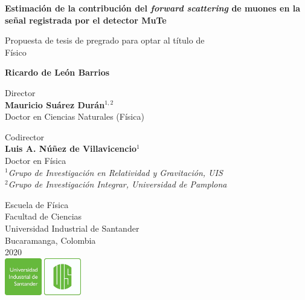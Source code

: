 \documentclass[12pt]{report}
\begin{document}
\begin{titlepage}
   \begin{center}
       \vspace*{1cm}
       
       
       \large
       \textbf{Estimación de la contribución del \textit{forward scattering} de muones en la señal registrada por el detector MuTe}
       
 
       \vspace{1.5cm}
 
       \small
       Propuesta de tesis de pregrado para optar al título de \\
       Físico
       
       
       \normalsize
       \textbf{Ricardo de León Barrios}
       
       \small
       \vspace{1cm}
       Director\\
       \textbf{Mauricio Suárez Durán}$^{1,2}$\\
       Doctor en Ciencias Naturales (Física)
       
       \vspace{1cm}
       Codirector\\
       \textbf{Luis A. Núñez de Villavicencio}$^1$\\
       Doctor en Física\\
       
       \vspace{1cm}
       $^1$\textit{Grupo de Investigación en Relatividad y Gravitación, UIS}\\
       $^2$\textit{Grupo de Investigación Integrar, Universidad de Pamplona}
 
       \vfill
       
       
 
 
       
 
       \small
       Escuela de Física\\
       Facultad de Ciencias\\
       Universidad Industrial de Santander\\
       Bucaramanga, Colombia\\
       2020\\
       \vspace{0.3cm}
       \includegraphics[width=0.25\textwidth]{logo/logoUIS.png}
 
   \end{center}
\end{titlepage}
\end{document}
